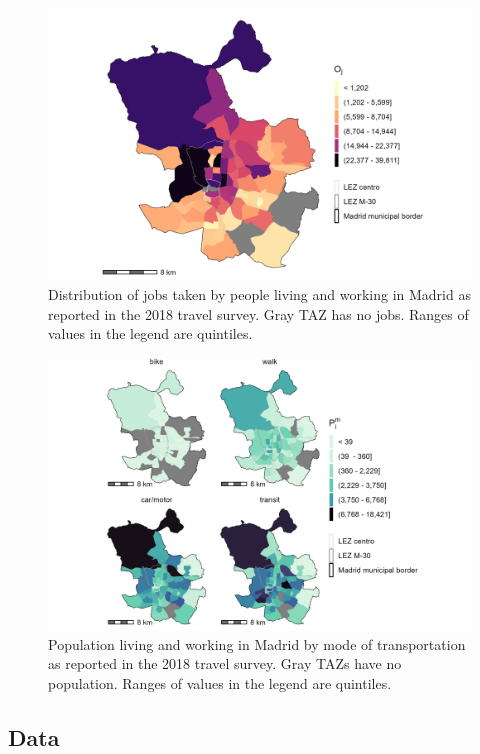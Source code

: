 \documentclass[10pt,letterpaper]{article}
\begin{document}
\begin{figure}

{\centering \includegraphics[width=0.85\linewidth]{images/i_jobs_zn208_plot} 

}

\caption{\label{fig:Fig2} Distribution of jobs taken by people living and working in Madrid as reported in the 2018 travel survey. Gray TAZ has no jobs. Ranges of values in the legend are quintiles.}\label{fig:jobs-plot}
\end{figure}

\begin{figure}

{\centering \includegraphics[width=0.85\linewidth]{images/im_populations_zn208_plot} 

}

\caption{\label{fig:Fig3} Population living and working in Madrid by mode of transportation as reported in the 2018 travel survey. Gray TAZs have no population. Ranges of values in the legend are quintiles.}\label{fig:pop-plot}
\end{figure}

\hypertarget{data}{%
\subsection{Data}\label{data}}
\end{document}
